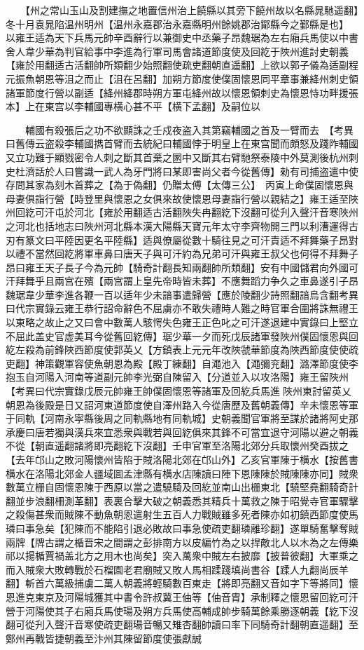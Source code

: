 　　【州之常山玉山及割建撫之地置信州治上饒縣以其旁下饒州故以名縣晁馳遥翻】　冬十月袁晁陷温州明州【温州永嘉郡治永嘉縣明州餘姚郡治鄮縣今之鄞縣是也】　以雍王适為天下兵馬元帥辛酉辭行以兼御史中丞藥子昂魏琚為左右廂兵馬使以中書舍人韋少華為判官給事中李進為行軍司馬會諸道節度使及回紇于陜州進討史朝義【雍於用翻适古活翻帥所類翻少始照翻使疏吏翻朝直遥翻】上欲以郭子儀為适副程元振魚朝恩等沮之而止【沮在呂翻】加朔方節度使僕固懷恩同平章事兼絳州刺史領諸軍節度行營以副适【絳州絳郡時朔方軍屯絳州故以懷恩領刺史為懷恩恃功畔援張本】上在東宫以李輔國專横心甚不平【横下孟翻】及嗣位以

　　輔國有殺張后之功不欲顯誅之壬戍夜盗入其第竊輔國之首及一臂而去　【考異曰舊傳云盗殺李輔國擕首臂而去統紀曰輔國悖于明皇上在東宫聞而頗怒及踐阼輔國又立功難于顯戮密令人刺之斷其首棄之圂中又斷其右臂馳祭泰陵中外莫測後杭州刺史杜濟話於人曰嘗識一武人為牙門將曰某即害尚父者今從舊傳】勑有司捕盗遣中使存問其家為刻木首葬之【為于偽翻】仍贈太傅【太傳三公】　丙寅上命僕固懷恩與母妻俱詣行營【時登里與懷恩之女俱來故使懷恩母妻詣行營以親結之】雍王适至陜州回紇可汗屯於河北【雍於用翻适古活翻陜失冉翻紇下沒翻可從刋入聲汗音寒陜州之河北也括地志曰陜州河北縣本漢大陽縣天寶元年太守李齊物開三門以利漕運得古刃有篆文曰平陸因更名平陸縣】适與僚屬從數十騎往見之可汗責适不拜舞藥子昂對以禮不當然回紇將軍車鼻曰唐天子與可汗約為兄弟可汗與雍王叔父也何得不拜舞子昂曰雍王天子長子今為元帥【騎奇計翻長知兩翻帥所類翻】安有中國儲君向外國可汗拜舞乎且兩宫在殯【兩宫謂上皇先帝時皆未葬】不應舞蹈力争久之車鼻遂引子昂魏琚韋少華李進各鞭一百以适年少未諳事遣歸營【應於陵翻少詩照翻諳烏含翻考異曰代宗實錄云雍王恭行詔命辭色不屈虜亦不敢失禮時人難之時官軍合圍將誅無禮王以東略之故止之又曰會中數萬人駭愕失色雍王正色叱之可汗遂退建中實錄曰上堅立不屈此盖史官虚美耳今從舊回紇傳】琚少華一夕而死戊辰諸軍發陜州僕固懷恩與回紇左殺為前鋒陜西節度使郭英乂【方鎮表上元元年改陜虢華節度為陜西節度使使疏吏翻】神策觀軍容使魚朝恩為殿【殿丁練翻】自澠池入【澠彌兖翻】潞澤節度使李抱玉自河陽入河南等道副元帥李光弼自陳留入【分道並入以攻洛陽】雍王留陜州　【考異曰代宗實錄戊辰元帥雍王帥僕固懷恩等諸軍及回紇兵馬進陜州東討留英乂朝恩為後殿是日又詔河東道節度使自澤州路入今從唐歷及舊朝義傳】辛未懷恩等軍于同軌【河南永寜縣後周之同軌縣地有同軌城】史朝義聞官軍將至謀於諸將阿史那承慶曰唐若獨與漢兵來宜悉衆與戰若與回紇俱來其鋒不可當宜退守河陽以避之朝義不從【朝直遥翻諸將即亮翻紇下沒翻】壬申官軍至洛陽北郊分兵取懷州癸酉拔之【去年邙山之敗河陽懷州皆陷于賊洛陽北郊在邙山外】乙亥官軍陳于横水【按舊書横水在洛陽北郊金人疆域圖孟津縣有横水店陳讀曰陣下恩陳陳於賊陳陳亦同】賊衆數萬立栅自固懷恩陳于西原以當之遣驍騎及回紇並南山出栅東北【驍堅堯翻騎奇計翻並步浪翻柵測革翻】表裏合擊大破之朝義悉其精兵十萬救之陳于昭覺寺官軍驟擊之殺傷甚衆而賊陳不動魚朝恩遣射生五百人力戰賊雖多死者陳亦如初鎮西節度使馬璘曰事急矣【犯陳而不能陷引退必敗故曰事急使疏吏翻璘離珍翻】遂單騎奮擊奪賊兩牌【牌古謂之楯晋宋之間謂之彭排南方以皮編竹為之以捍敵北人以木為之左傳樂祁以揚楯賈禍盖北方之用木也尚矣】突入萬衆中賊左右披靡【披普彼翻】大軍乘之而入賊衆大敗轉戰於石榴園老君廟賊又敗人馬相蹂踐填尚書谷【蹂人九翻尚辰羊翻】斬首六萬級捕虜二萬人朝義將輕騎數百東走【將即亮翻又音如字下等將同】懷恩進克東京及河陽城獲其中書令許叔冀王伷等【伷音胄】承制釋之懷恩留回紇可汗營于河陽使其子右廂兵馬使瑒及朔方兵馬使高輔成帥步騎萬餘乘勝逐朝義【紇下沒翻可從刋入聲汗音寒使疏吏翻瑒音暢又雉杏翻帥讀曰率下同騎奇計翻朝直遥翻】至鄭州再戰皆捷朝義至汴州其陳留節度使張獻誠